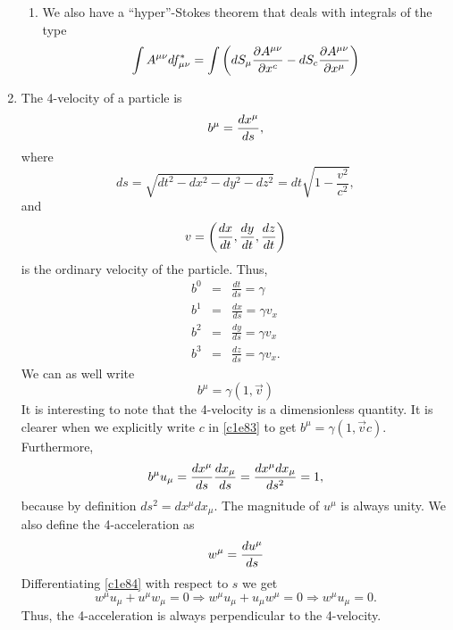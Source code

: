 \begin{enumerate}
\begin{enumerate}
\item We also have a ``hyper''-Stokes theorem that deals with integrals of the 
type
\begin{equation}\label{c1e77}
\int A^{\mu\nu}df^\ast_{\mu\nu} = 
\int\left(dS_\mu\frac{\partial{A^{\mu\nu}}}{\partial{x^c}} - dS_c\frac{\partial{A^{\mu\nu}}}{\partial{x^\mu}}\right)
\end{equation}
\end{enumerate}

\item The 4-velocity of a particle is
\begin{equation}\label{c1e78}b^\mu = \frac{d{x^\mu}}{d{s}},
\end{equation}
where
\[
ds = \sqrt{dt^2 - dx^2 - dy^2 - dz^2} = dt\sqrt{1 - \frac{v^2}{c^2}},
\]
and
\[
v = \left(\frac{d{x}}{d{t}}, \frac{d{y}}{d{t}}, \frac{d{z}}{d{t}}\right)
\]
is the ordinary velocity of the particle. Thus,
\begin{eqnarray}
b^0&=&\frac{dt}{ds} = \gamma \label{c1e79}\\
b^1&=&\frac{dx}{ds} = \gamma v_x \label{c1e80} \\
b^2&=&\frac{dy}{ds} = \gamma v_x \label{c1e81} \\
b^3&=&\frac{dz}{ds} = \gamma v_x. \label{c1e82}
\end{eqnarray}
We can as well write
\begin{equation}\label{c1e83}
b^\mu = \gamma(1, \vec{v}) 
\end{equation}
It is interesting to note that the 4-velocity is a dimensionless quantity. It
is clearer when we explicitly write $c$ in \eqref{c1e83} to get $b^\mu = \gamma(
1, \vec{v}{c})$. Furthermore,
\begin{equation}\label{c1e84}
b^\mu u_\mu = \frac{d{x^\mu}}{d{s}}\frac{d{x_\mu}}{d{s}} = \frac{dx^\mu dx_\mu}{ds^2} = 1,
\end{equation}
because by definition $ds^2 = dx^\mu dx_\mu$. The magnitude of $u^\mu$ is always
unity. We also define the 4-acceleration as
\begin{equation}\label{c1e85}
w^\mu = \frac{d{u^\mu}}{d{s}}
\end{equation}
Differentiating \eqref{c1e84} with respect to $s$ we get
\begin{equation}\label{c1e86}
w^\mu u_\mu + u^\mu w_\mu = 0 \Rightarrow w^\mu u_\mu + u_\mu w^\mu = 0 \Rightarrow w^\mu u_\mu = 0.
\end{equation}
Thus, the 4-acceleration is always perpendicular to the 4-velocity.
\end{enumerate}

